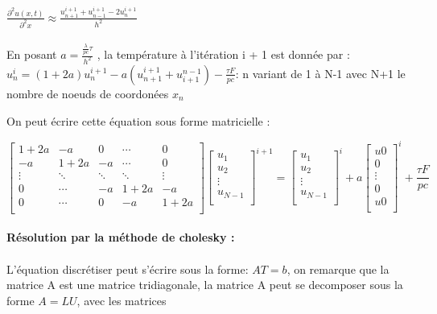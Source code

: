 \documentclass[french]{report}
\begin{document}
$\frac{\partial^2 u(x,t)}{\partial^2 x} \approx \frac{u_{n+1}^{i+1}+u_{n-1}^{i+1} -2u_{n}^{i+1} }{h^2}$\\\\
En posant $a= \frac{\frac{\lambda}{pc}\tau}{h^2}$
, la température à l'itération i + 1 est donnée par :\\

$u_n^{i} =(1+2a)u_n^{i+1} - a(u_{n+1}^{i+1} + u_{i+1}^{n-1}) -\frac{\tau F}{pc}$:  n variant de 1 à N-1 avec N+1 le nombre de noeuds de coordonées $x_n$

On peut écrire cette équation sous forme matricielle :

$$
\begin{bmatrix}
   1+2a & -a  & 0& \cdots & 0\\
   -a & 1+2a & -a& \cdots& 0\\
   \vdots & \ddots & \ddots & \ddots & \vdots \\
    0 & \cdots& -a & 1+2a & -a \\
    0 & \cdots & 0 & -a & 1+2a \\
\end{bmatrix}
\begin{bmatrix}
    u_{1}\\
    u_{2}\\
    \vdots\\
    u_{N-1}\\
\end{bmatrix}^{i+1}
=
\begin{bmatrix}
    u_{1}\\
    u_{2}\\
    \vdots\\
    u_{N-1}\\

\end{bmatrix}^{i}
+a
\begin{bmatrix}
    u0\\
    0\\
    \vdots\\
    0\\
    u0\\
\end{bmatrix}^{i}
+\frac{ \tau F}{p c}
$$\\
\textbf{Résolution par la méthode de cholesky :}\\\\
L'équation discrétiser peut s'écrire sous la forme: $AT=b$, on remarque que la matrice A est une matrice tridiagonale, la matrice A peut se decomposer sous la forme $A = LU$, avec les matrices
\end{document}
